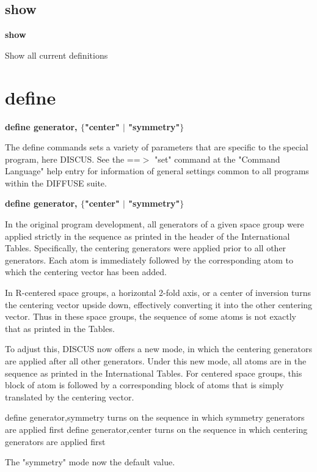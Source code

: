 \subsection*{show}
{\bf show \par }
\vspace{3pt}
Show all current definitions 
\section{define}
{\bf define generator, $ \{$"center" $| $ "symmetry"$\} $ \par }
\par
\vspace{3pt}
The define commands sets a variety of parameters that are specific 
to the special program, here DISCUS. See the ==$> $ "set" command at 
the "Command Language" help entry for information of general settings 
common to all programs within the DIFFUSE suite. 
\par
{\bf define generator, $ \{$"center" $| $ "symmetry"$\} $ \par }
\par
\vspace{3pt}
In the original program development, all generators of a given space 
group were applied strictly in the sequence as printed in the header 
of the International Tables. Specifically, the centering generators 
were applied prior to all other generators. Each atom is immediately 
followed by the corresponding atom to which the centering vector has 
been added. 
\par
In R-centered space groups, a horizontal 2-fold axis, or a center of 
inversion turns the centering vector upside down, effectively 
converting it into the other centering vector. Thus in these space 
groups, the sequence of some atoms is not exactly that as printed in 
the Tables. 
\par
To adjust this, DISCUS now offers a new mode, in which the centering 
generators are applied after all other generators. Under this new mode, 
all atoms are in the sequence as printed in the International Tables. 
For centered space groups, this block of atom is followed by a 
corresponding block of atoms that is simply translated by the centering 
vector. 
\par
define generator,symmetry 
turns on the sequence in which symmetry generators are applied first 
define generator,center 
turns on the sequence in which centering generators are applied first 
\par
The "symmetry" mode now the default value. 
